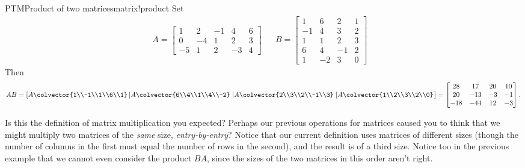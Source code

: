 \begin{example}{PTM}{Product of two matrices}{matrix!product}
Set
%
\begin{align*}
A=
\begin{bmatrix}
1 & 2 & -1 & 4 & 6\\
0 & -4 & 1 & 2 & 3\\
-5 & 1 & 2 & -3 & 4
\end{bmatrix}
&&
B=
\begin{bmatrix}
1 & 6 & 2 & 1\\
-1 & 4 & 3 & 2\\
1 & 1 & 2 & 3\\
6 & 4 & -1 & 2\\
1 & -2 & 3 & 0
\end{bmatrix} &
\end{align*}
%
Then
%
\begin{equation*}
AB=
\left[
A\colvector{1\\-1\\1\\6\\1}
\left\lvert A\colvector{6\\4\\1\\4\\-2}\right.
\left\lvert A\colvector{2\\3\\2\\-1\\3}\right.
\left\lvert A\colvector{1\\2\\3\\2\\0}\right.
\right]
=
\begin{bmatrix}
28 & 17 & 20 & 10\\
20 & -13 & -3 & -1\\
-18 & -44 & 12 & -3
\end{bmatrix}.
\end{equation*}
%
\end{example}
%
Is this the definition of matrix multiplication you expected?  Perhaps our previous operations for matrices caused you to think that we might multiply two matrices of the {\em same} size, {\em entry-by-entry}?  Notice that our current definition uses matrices of different sizes (though the number of columns in the first must equal the number of rows in the second), and the result is of a third size.  Notice too in the previous example that we cannot even consider the product $BA$, since the sizes of the two matrices in this order aren't right.\par
